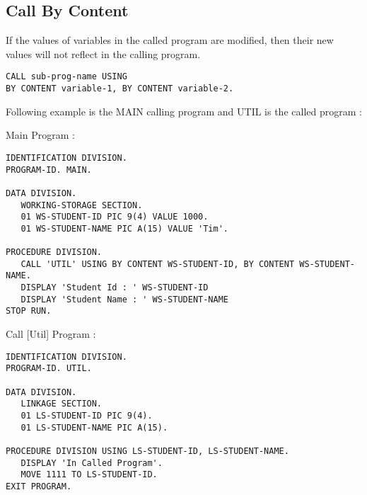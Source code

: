 \documentclass[12pt]{article}
\begin{document}
\newpage

\subsection{Call By Content}

If the values of variables in the called program are modified, then their new values will not reflect in the calling program.

\begin{lstlisting}[language=Cobol]
CALL sub-prog-name USING 
BY CONTENT variable-1, BY CONTENT variable-2.
\end{lstlisting}


Following example is the MAIN calling program and UTIL is the called program :

Main Program :
\begin{lstlisting}[language=Cobol]
IDENTIFICATION DIVISION.
PROGRAM-ID. MAIN.

DATA DIVISION.
   WORKING-STORAGE SECTION.
   01 WS-STUDENT-ID PIC 9(4) VALUE 1000.
   01 WS-STUDENT-NAME PIC A(15) VALUE 'Tim'.

PROCEDURE DIVISION.
   CALL 'UTIL' USING BY CONTENT WS-STUDENT-ID, BY CONTENT WS-STUDENT-NAME.
   DISPLAY 'Student Id : ' WS-STUDENT-ID
   DISPLAY 'Student Name : ' WS-STUDENT-NAME
STOP RUN.
\end{lstlisting}


Call [Util] Program :
\begin{lstlisting}[language=Cobol]
IDENTIFICATION DIVISION.
PROGRAM-ID. UTIL.

DATA DIVISION.
   LINKAGE SECTION.
   01 LS-STUDENT-ID PIC 9(4).
   01 LS-STUDENT-NAME PIC A(15).

PROCEDURE DIVISION USING LS-STUDENT-ID, LS-STUDENT-NAME.
   DISPLAY 'In Called Program'.
   MOVE 1111 TO LS-STUDENT-ID.
EXIT PROGRAM.
\end{lstlisting}
\end{document}
